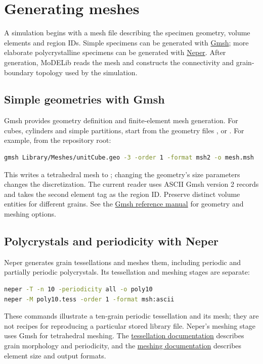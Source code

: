 \section{Generating meshes}\label{sec:meshGeneration}
A simulation begins with a mesh file describing the specimen geometry, volume elements and region IDs. Simple specimens can be generated with \href{https://gmsh.info/}{Gmsh}; more elaborate polycrystalline specimens can be generated with \href{https://neper.info/}{Neper}. After generation, MoDELib reads the mesh and constructs the connectivity and grain-boundary topology used by the simulation.

\subsection{Simple geometries with Gmsh}
Gmsh provides geometry definition and finite-element mesh generation. For cubes, cylinders and simple partitions, start from the geometry files ,  or . For example, from the repository root:
\begin{lstlisting}[language=bash,basicstyle=\footnotesize\ttfamily]
gmsh Library/Meshes/unitCube.geo -3 -order 1 -format msh2 -o mesh.msh
\end{lstlisting}
This writes a tetrahedral mesh to ; changing the geometry's size parameters changes the discretization. The current reader uses ASCII Gmsh version 2 records and takes the second element tag as the region ID. Preserve distinct volume entities for different grains. See the \href{https://gmsh.info/doc/texinfo/gmsh.html}{Gmsh reference manual} for geometry and meshing options.

\subsection{Polycrystals and periodicity with Neper}
Neper generates grain tessellations and meshes them, including periodic and partially periodic polycrystals. Its tessellation and meshing stages are separate:
\begin{lstlisting}[language=bash,basicstyle=\footnotesize\ttfamily]
neper -T -n 10 -periodicity all -o poly10
neper -M poly10.tess -order 1 -format msh:ascii
\end{lstlisting}
These commands illustrate a ten-grain periodic tessellation and its mesh; they are not recipes for reproducing a particular stored library file. Neper's meshing stage uses Gmsh for tetrahedral meshing. The \href{https://neper.info/doc/neper_t.html}{tessellation documentation} describes grain morphology and periodicity, and the \href{https://neper.info/doc/neper_m.html}{meshing documentation} describes element size and output formats.

